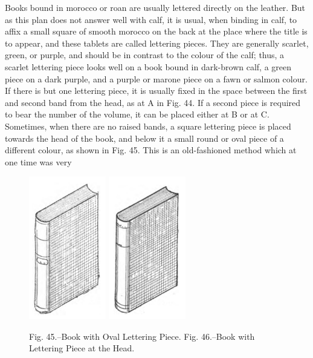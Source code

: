 \documentclass[twoside]{book}
\begin{document}
Books bound in morocco or roan are usually
lettered directly on the leather. But as this plan
does not answer well with calf, it is usual, when
binding in calf, to affix a small square of smooth
morocco on the back at the place where the title is
to appear, and these tablets are called lettering
pieces. They are generally scarlet, green, or purple,
and should be in contrast to the colour of the calf;
thus, a scarlet lettering piece looks well on a book
bound in dark-brown calf, a green piece on a dark
purple, and a purple or marone piece on a fawn or
\pagebreak
salmon colour. If there is but one lettering piece,
it is usually fixed in the space between the first and
second band from the head, as at A in Fig. 44. If
a second piece is required to bear the number of
the volume, it can be placed either at B or at C.
Sometimes, when there are no raised bands, a
square lettering piece is placed towards the head
of the book, and below it a small round or oval piece
of a different colour, as shown in Fig. 45. This is an
old-fashioned method which at one time was very
	\begin{figure}
		\centering
		\includegraphics[width=0.3\textwidth]{Figures/_045.png}
		\includegraphics[width=0.3\textwidth]{Figures/_046.png}
		\caption*{
			Fig. 45.--Book with Oval Lettering Piece.
			Fig. 46.--Book with Lettering Piece at the Head.
		}
	\end{figure}
\end{document}
